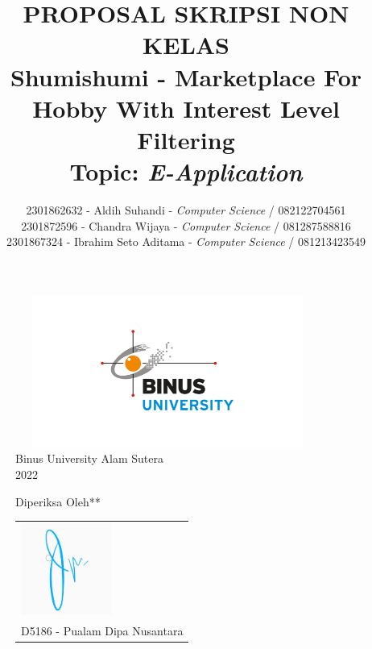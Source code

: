 \documentclass[a4paper]{article}
\begin{document}

\title{PROPOSAL SKRIPSI NON KELAS\\Shumishumi - Marketplace For Hobby With Interest Level Filtering\large\\\textbf{Topic: }\textit{E-Application}}
\author{2301862632 - Aldih Suhandi - \textit{Computer Science} / 082122704561\\2301872596 - Chandra Wijaya - \textit{Computer Science} / 081287588816\\2301867324 - Ibrahim Seto Aditama - \textit{Computer Science} / 081213423549}


\maketitle
\begin{figure}[h]
    \centering
    \includegraphics[width=10cm,height=5cm]{logo_binus.png}\\
    Binus University Alam Sutera\\
    2022
\end{figure}
\begin{figure}[h]
    \centering
    Diperiksa Oleh**\\
    \begin{tabular}{@{}p{2.5in}@{}}
        \centering
        \includegraphics[width=3cm]{ttd.png}\\
        D5186 - Pualam Dipa Nusantara
    \end{tabular}
\end{figure}

\newpage
{}
\tableofcontents
\end{document}
